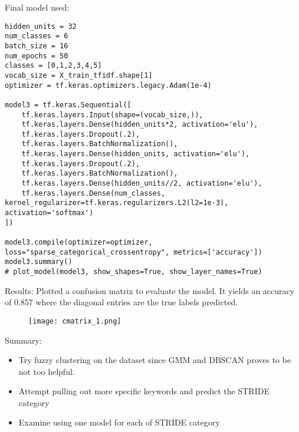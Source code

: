 Final model used:
\begin{lstlisting}[frame=single]
hidden_units = 32
num_classes = 6
batch_size = 16
num_epochs = 50
classes = [0,1,2,3,4,5]
vocab_size = X_train_tfidf.shape[1]
optimizer = tf.keras.optimizers.legacy.Adam(1e-4)

model3 = tf.keras.Sequential([
    tf.keras.layers.Input(shape=(vocab_size,)),
    tf.keras.layers.Dense(hidden_units*2, activation='elu'),
    tf.keras.layers.Dropout(.2),
    tf.keras.layers.BatchNormalization(),
    tf.keras.layers.Dense(hidden_units, activation='elu'),
    tf.keras.layers.Dropout(.2),
    tf.keras.layers.BatchNormalization(),
    tf.keras.layers.Dense(hidden_units//2, activation='elu'),
    tf.keras.layers.Dense(num_classes, kernel_regularizer=tf.keras.regularizers.L2(l2=1e-3), activation='softmax')
])

model3.compile(optimizer=optimizer, loss="sparse_categorical_crossentropy", metrics=['accuracy'])
model3.summary()
# plot_model(model3, show_shapes=True, show_layer_names=True)
\end{lstlisting}
\clearpage
Results:
Plotted a confusion matrix to evaluate the model. It yields an accuracy of 0.857 where the diagonal entries are the true labels predicted.
\begin{figure}[!h]
    \texttt{[image: cmatrix\_1.png]}
\end{figure}

Summary:
\vspace{-\baselineskip}
\begin{itemize}
    \item Try fuzzy clustering on the dataset since GMM and DBSCAN proves to be not too helpful.
    \item Attempt pulling out more specific keywords and predict the STRIDE category
    \item Examine using one model for each of STRIDE category
\end{itemize}